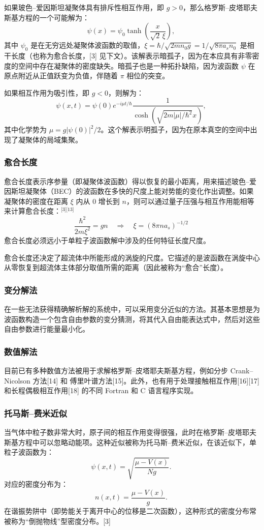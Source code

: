 如果玻色–爱因斯坦凝聚体具有排斥性相互作用，即 $g > 0$，那么格罗斯–皮塔耶夫斯基方程的一个可能解为：
$$
\psi(x) = \psi_0 \tanh\left( \frac{x}{\sqrt{2} \, \xi} \right),~
$$
其中 $\psi_0$ 是在无穷远处凝聚体波函数的取值，$\xi = \hbar/\sqrt{2 m n_0 g} = 1/\sqrt{8\pi a_s n_0}$ 是相干长度（也称为愈合长度，[3] 见下文）。该解表示暗孤子，因为在本应具有非零密度的空间中存在凝聚体的密度缺失。暗孤子也是一种拓扑缺陷，因为波函数 $\psi$ 在原点附近从正值跃变为负值，伴随着 $\pi$ 相位的突变。

如果相互作用为吸引性，即 $g < 0$，则解为：
$$
\psi(x, t) = \psi(0) e^{-i\mu t / \hbar} \frac{1}{\cosh\left( \sqrt{2m|\mu|/\hbar^2} x \right)},~
$$
其中化学势为 $\mu = g |\psi(0)|^2/2$。这个解表示明孤子，因为在原本真空的空间中出现了凝聚体的局域集聚。
\subsubsection{愈合长度}
愈合长度表示序参量（即凝聚体波函数）得以恢复的最小距离，用来描述玻色–爱因斯坦凝聚体（BEC）的波函数在多快的尺度上能对势能的变化作出调整。如果凝聚体的密度在距离 $\xi$ 内从 0 增长到 $n$，则可以通过量子压强与相互作用能相等来计算愈合长度：\(^\text{[3][13]}\)
$$
\frac{\hbar^2}{2m \xi^2} = gn \quad \Longrightarrow \quad \xi = \left(8\pi n a_s\right)^{-1/2}~
$$
愈合长度必须远小于单粒子波函数解中涉及的任何特征长度尺度。

愈合长度还决定了超流体中所能形成的涡旋的尺度。它描述的是波函数在涡旋中心从零恢复到超流体主体部分取值所需的距离（因此被称为“愈合”长度）。
\subsubsection{变分解法}
在一些无法获得精确解析解的系统中，可以采用变分近似的方法。其基本思想是为波函数构造一个包含自由参数的变分猜测，将其代入自由能表达式中，然后对这些自由参数进行能量最小化。
\subsubsection{数值解法}
目前已有多种数值方法被用于求解格罗斯–皮塔耶夫斯基方程，例如分步 Crank–Nicolson 方法[14] 和 傅里叶谱方法[15]。此外，也有用于处理接触相互作用[16][17] 和长程偶极相互作用[18] 的不同 Fortran 和 C 语言程序实现。
\subsubsection{托马斯–费米近似}
当气体中粒子数非常大时，原子间的相互作用变得很强，此时在格罗斯–皮塔耶夫斯基方程中可以忽略动能项。这种近似被称为托马斯–费米近似，在该近似下，单粒子波函数为：
$$
\psi(x, t) = \sqrt{ \frac{ \mu - V(x) }{ N g } }.~
$$
对应的密度分布为：
$$
n(x, t) = \frac{ \mu - V(x) }{ g }.~
$$
在谐振势阱中（即势能关于离开中心的位移是二次函数），这种形式的密度分布常被称为“倒抛物线”型密度分布。[3]
